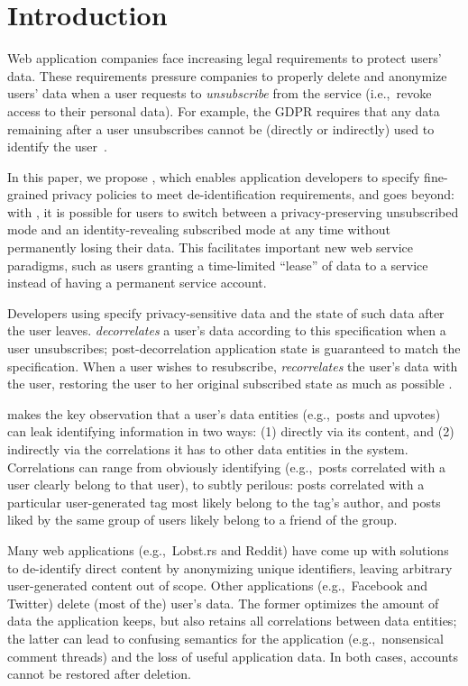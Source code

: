 \section{Introduction}

Web application companies face increasing legal requirements to protect users’ data. These
requirements pressure companies to properly delete and anonymize users' data when a user requests to
\emph{unsubscribe} from the service (i.e.,\ revoke access to their personal data). For example, the
GDPR requires that any data remaining after a user unsubscribes cannot be (directly or
indirectly) used to identify the user~\cite{gdpr}.  

In this paper, we propose \sys{}, which enables application developers to specify fine-grained
privacy policies to meet de-identification requirements, and goes beyond: with \sys{}, it is
possible for users to switch between a privacy-preserving unsubscribed mode and an
identity-revealing subscribed mode at any time without permanently losing their data. This
facilitates important new web service paradigms, such as users granting a time-limited ``lease'' of
data to a service instead of having a permanent service account.

Developers using \sys{} specify privacy-sensitive data and the state of such data after the user
leaves. \sys{} \emph{decorrelates} a user's data according to this specification when a user unsubscribes;
post-decorrelation application state is guaranteed to match the specification.  When a user wishes
to resubscribe, \sys{} \emph{recorrelates} the user's data with the user, restoring the user to her
original subscribed state as much as possible . 

\sys{} makes the key observation that a user's data entities (e.g.,\ posts and upvotes) can leak identifying
information in two ways: (1) directly via its content, and (2) indirectly via the correlations it has to
other data entities in the system.  
Correlations can range from obviously identifying (e.g.,\ posts correlated
with a user clearly belong to that user), to subtly perilous: posts correlated with a
particular user-generated tag most likely belong to the tag's author, and posts liked by the  
same group of users likely belong to a friend of the group. 

Many web applications (e.g.,\ Lobst.rs and Reddit) have come up with solutions to de-identify direct
content by anonymizing unique identifiers, leaving arbitrary user-generated content out of scope.
Other applications (e.g.,\ Facebook and Twitter) delete (most of the) user's data. The former
optimizes the amount of data the application keeps, but also retains all correlations between data
entities; the latter can lead to confusing semantics for the application (e.g.,\ nonsensical comment
threads) and the loss of useful application data. In both cases, accounts cannot be restored after
deletion.

